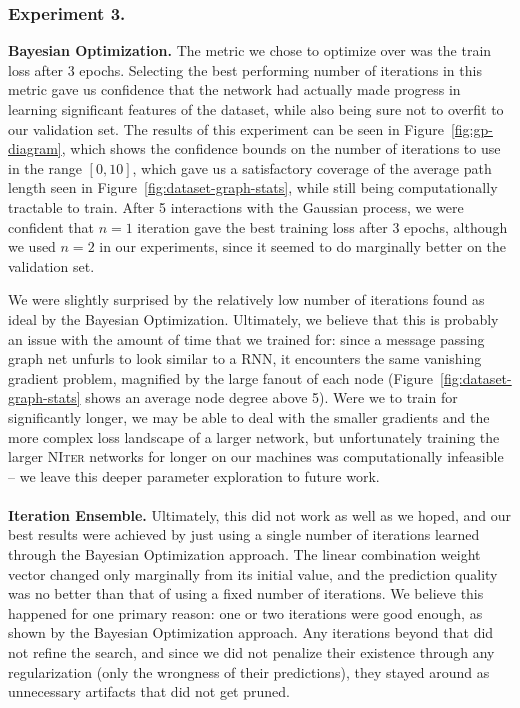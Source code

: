 \subsubsection{Experiment 3.}
\textbf{Bayesian Optimization.}
The metric we chose to optimize over was the train loss after 3 epochs.
Selecting the best performing number of iterations in this metric gave us confidence that the network had actually made progress in learning significant features of the dataset, while also being sure not to overfit to our validation set.
The results of this experiment can be seen in Figure~\ref{fig:gp-diagram}, which shows the confidence bounds on the number of iterations to use in the range $[0, 10]$, which gave us a satisfactory coverage of the average path length seen in Figure~\ref{fig:dataset-graph-stats}, while still being computationally tractable to train.
After 5 interactions with the Gaussian process, we were confident that $n=1$ iteration gave the best training loss after 3 epochs, although we used $n=2$ in our experiments, since it seemed to do marginally better on the validation set.

We were slightly surprised by the relatively low number of iterations found as ideal by the Bayesian Optimization.
Ultimately, we believe that this is probably an issue with the amount of time that we trained for: since a message passing graph net unfurls to look similar to a RNN, it encounters the same vanishing gradient problem, magnified by the large fanout of each node (Figure~\ref{fig:dataset-graph-stats} shows an average node degree above 5).
Were we to train for significantly longer, we may be able to deal with the smaller gradients and the more complex loss landscape of a larger network, but unfortunately training the larger \textsc{NIter} networks for longer on our machines was computationally infeasible -- we leave this deeper parameter exploration to future work.
\\~\\
\textbf{Iteration Ensemble.}
Ultimately, this did not work as well as we hoped, and our best results were achieved by just using a single number of iterations learned through the Bayesian Optimization approach.
The linear combination weight vector changed only marginally from its initial value, and the prediction quality was no better than that of using a fixed number of iterations.
We believe this happened for one primary reason: one or two iterations were good enough, as shown by the Bayesian Optimization approach.
Any iterations beyond that did not refine the search, and since we did not penalize their existence through any regularization (only the wrongness of their predictions), they stayed around as unnecessary artifacts that did not get pruned.

